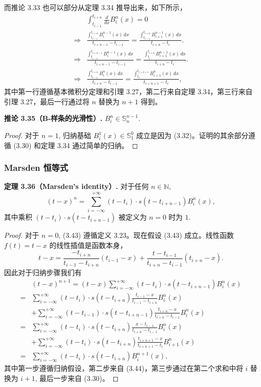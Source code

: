 \documentclass[a4paper]{ctexart}
\begin{document}
{而推论 3.33 也可以部分从定理 3.34 推导出来，如下所示，
\begin{align*}
&\int_{t_{i-1}}^{t_{i+n}} \frac{d}{dx} B_{i}^{n}(x) = 0 \\
\Rightarrow &\frac{\int_{t_{i-1}}^{t_{i+n}} B_{i}^{n-1}(x) \, dx}{t_{i+n-1} - t_{i-1}} = \frac{\int_{t_{i-1}}^{t_{i+n}} B_{i+1}^{n-1}(x) \, dx}{t_{i+n} - t_{i}}. \\
\Rightarrow &\frac{\int_{t_{i-1}}^{t_{i+n-1}} B_{i}^{n-1}(x) \, dx}{t_{i+n-1} - t_{i-1}} = \frac{\int_{t_{i}}^{t_{i+n}} B_{i+1}^{n-1}(x) \, dx}{t_{i+n} - t_{i}}. \\
\Rightarrow &\frac{\int_{t_{i-1}}^{t_{i+n}} B_{i}^{n}(x) \, dx}{t_{i+n} - t_{i-1}} = \frac{\int_{t_{i}}^{t_{i+n+1}} B_{i+1}^{n}(x) \, dx}{t_{i+n+1} - t_{i}},
\end{align*}
其中第一行遵循基本微积分定理和引理 3.27，第二行来自定理 3.34，第三行来自引理 3.27，最后一行通过将 $n$ 替换为 $n+1$ 得到。

\noindent \textbf{推论 3.35（B-样条的光滑性）.} $B_{i}^{n} \in \mathbb{S}_{n}^{n-1}$.

\begin{proof}
对于 $n = 1$, 归纳基础 $B_{i}^{1}(x) \in \mathbb{S}_{1}^{0}$ 成立是因为 (3.32)。证明的其余部分遵循 (3.30) 和定理 3.34 通过简单的归纳。
\end{proof} 

\subsubsection{Marsden 恒等式}

\noindent \textbf{定理 3.36（Marsden's identity）.} 对于任何 $n \in \mathbb{N}$, 
\[
(t-x)^n = \sum_{i=-\infty}^{+\infty} (t-t_i) \cdot s(t-t_{i+n-1}) B_i^n(x), \tag{3.43}
\]
其中乘积 $(t - t_i) \cdot s(t - t_{i + n - 1})$ 被定义为 $n = 0$ 时为 $1$.

\begin{proof}
对于 $n = 0$, (3.43) 遵循定义 3.23。现在假设 (3.43) 成立。线性函数 $f(t)=t - x$ 的线性插值是函数本身，
\[
  t-x = \frac{-t_{i+n}}{t_{i-1}-t_{i+n}}(t_{i-1}-x) + \frac{t-t_{i-1}}{t_{i+n}-t_{i-1}}(t_{i+n}-x). \tag{3.44}
\]
因此对于归纳步骤我们有
\begin{align*}
  &(t-x)^{n+1} = (t-x) \sum_{i=-\infty}^{+\infty} (t-t_i) \cdot s(t-t_{i+n-1}) B_i^n(x) \\
  =& \sum_{i=-\infty}^{+\infty} (t-t_i) \cdot s(t-t_{i+n}) \frac{t_{i-1}-x}{t_{i-1}-t_{i+n}} B_i^n(x) \\
  &+ \sum_{i=-\infty}^{+\infty} (t-t_{i-1}) \cdot s(t-t_{i+n-1}) \frac{t_{i+n}-x}{t_{i+n}-t_{i-1}} B_i^n(x) \\
  =& \sum_{i=-\infty}^{+\infty} (t-t_i) \cdot s(t-t_{i+n}) \frac{x-t_{i-1}}{t_{i+n}-t_{i-1}} B_i^n(x) \\
  &+ \sum_{i=-\infty}^{+\infty} (t-t_i) \cdot s(t-t_{i+n}) \frac{t_{i+n+1}-x}{t_{i+n+1}-t_i} B_{i+1}^n(x) \\
  =& \sum_{i=-\infty}^{+\infty} (t-t_i) \cdot s(t-t_{i+n}) B_i^{n+1}(x),
\end{align*}
其中第一步遵循归纳假设，第二步来自 (3.44)，第三步通过在第二个求和中将 $i$ 替换为 $i+1$, 最后一步来自 (3.30)。    
\end{proof}

}
\end{document}
